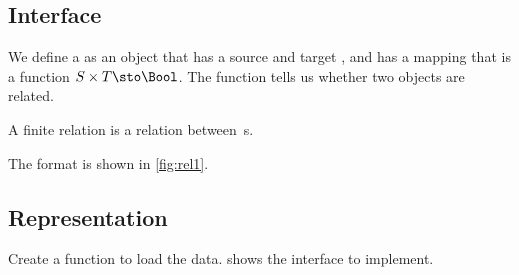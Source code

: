 

\subsection*{Interface}

We define a \Relation as an object that has a source and target \Setoid, and has a mapping that is a function $S \times T \sto \Bool$.
The function tells us whether two objects are related.


A finite relation  is a relation between \FiniteSet\,s.


The format is shown in \cref{fig:rel1}.

\subsection*{Representation}{}

\begin{marginfigure}
    \caption{}
    \label{fig:rel1}
\end{marginfigure}

\begin{codeexercise}
    Create a function to load the data.
     shows the interface to implement.

\end{codeexercise}

